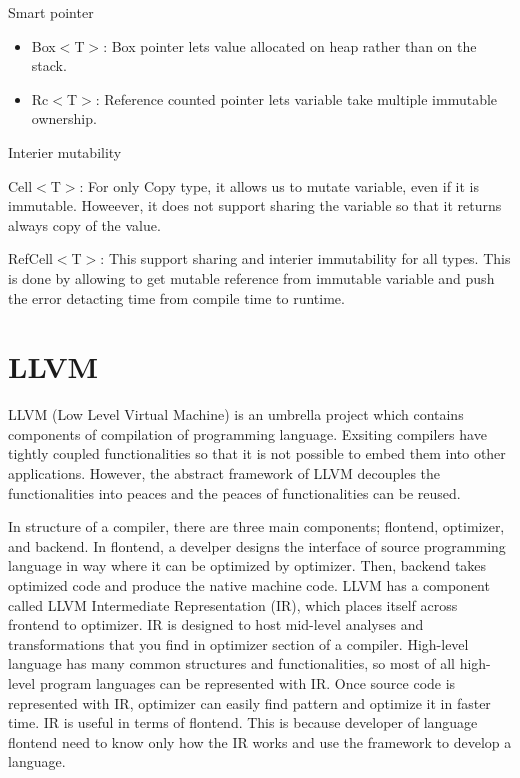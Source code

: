 Smart pointer
\begin{itemize}
    \item Box$<$T$>$: Box pointer lets value allocated on heap rather than on the stack.
    \item Rc$<$T$>$: Reference counted pointer lets variable take multiple immutable ownership.
\end{itemize}

Interier mutability
    \item Cell$<$T$>$: For only Copy type, it allows us to mutate variable, even if it is immutable. Howeever, it does not support sharing the variable so that it returns always copy of the value.
    \item RefCell$<$T$>$: This support sharing and interier immutability for all types. This is done by allowing to get mutable reference from immutable variable and push the error detacting time from compile time to runtime.
    

\section{LLVM}
\label{sec:history}
LLVM (Low Level Virtual Machine) is an umbrella project which contains components of compilation of programming language.
Exsiting compilers have tightly coupled functionalities so that it is not possible to embed them into other applications.
However, the abstract framework of LLVM decouples the functionalities into peaces and the peaces of functionalities can be reused.

In structure of a compiler, there are three main components; flontend, optimizer, and backend. 
In flontend, a develper designs the interface of source programming language in way where it can be optimized by optimizer. 
Then, backend takes optimized code and produce the native machine code. LLVM has a component called LLVM Intermediate Representation (IR), 
which places itself across frontend to optimizer. IR is designed to host mid-level analyses and transformations that you find in optimizer section of a compiler.
High-level language has many common structures and functionalities, so most of all high-level program languages can be represented with IR. 
Once source code is represented with IR, optimizer can easily find pattern and optimize it in faster time. 
IR is useful in terms of flontend. This is because developer of language flontend need to know only how the IR works and use the framework to develop a language.


